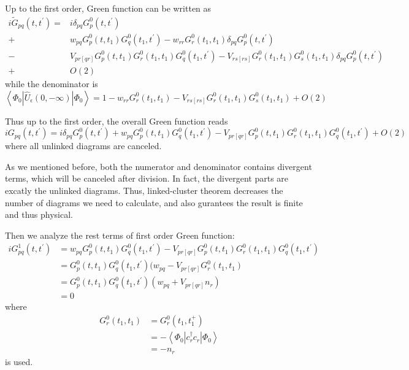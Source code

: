Up to the first order, Green function can be written as
\begin{equation}
	\begin{aligned}
		i\tilde{G}_{pq}(t,t^{\prime})=&i \delta_{pq} G^0_{p}(t,t^{\prime})
		\\
		+&w_{pq} G^0_p(t,t_1) G^0_q(t_1,t^{\prime}) - w_{rr} G^0_r(t_1,t_1) \delta_{pq} G^0_{p}(t,t^{\prime})
		\\
		-&V_{pr[qr]} G^0_{p}(t,t_1) G^0_{r}(t_1,t_1) G^0_{q}(t_1,t^{\prime})
		- V_{rs[rs]} G^0_r(t_1,t_1) G^0_s(t_1,t_1) \delta_{pq} G^0_p(t,t^{\prime})
		\\
		+&O(2)
	\end{aligned}
\end{equation}
while the denominator is 
\begin{equation}
	\left\langle\Phi_{0}\left|\hat{U}_{\epsilon}(0,-\infty)\right| \Phi_{0}\right\rangle=1
		- w_{rr} G^0_r(t_1,t_1)
		- V_{rs[rs]} G^0_r(t_1,t_1) G^0_s(t_1,t_1)
		+ O(2)
\end{equation}

Thus up to the first order,  the overall Green function reads
\begin{equation}
	i G_{pq}(t,t^{\prime})=i \delta_{pq} G^0_{p}(t,t^{\prime})
	+w_{pq} G^0_p(t,t_1) G^0_q(t_1,t^{\prime})
	-V_{pr[qr]} G^0_{p}(t,t_1) G^0_{r}(t_1,t_1) G^0_{q}(t_1,t^{\prime}) +O(2)
\end{equation}
where all unlinked diagrams are canceled.

As we mentioned before, both the numerator and denominator contains divergent terms, which will be canceled after division.
In fact, the divergent parts are excatly the unlinked diagrams.
Thus, linked-cluster theorem decreases the number of diagrams we need to calculate, and also gurantees the result is finite and thus physical.

Then we analyze the rest terms of first order Green function:
\begin{equation}
	\begin{aligned}
		i G^1_{pq}(t,t^{\prime}) &= w_{pq} G^0_p(t,t_1) G^0_q(t_1,t^{\prime})
		-V_{pr[qr]} G^0_{p}(t,t_1) G^0_{r}(t_1,t_1) G^0_{q}(t_1,t^{\prime})
		\\
		&= G^0_p(t,t_1) G^0_q(t_1,t^{\prime}) (w_{pq}-V_{pr[qr]}G^0_r(t_1,t_1)
		\\
		&= G^0_p(t,t_1) G^0_q(t_1,t^{\prime}) (w_{pq}+V_{pr[qr]}n_r)
		\\
		&=0
	\end{aligned}
\end{equation}
where 
\begin{equation}
	\begin{aligned}
		G^0_r(t_1,t_1)&=G^0_r(t_1,t_1^{+})
		\\
		&=- \left\langle\Phi_{0}\left|
		c_r^{\dagger} c_r
		\right| \Phi_{0}\right\rangle
		\\
		&=-n_r
	\end{aligned}
\end{equation}
is used.

